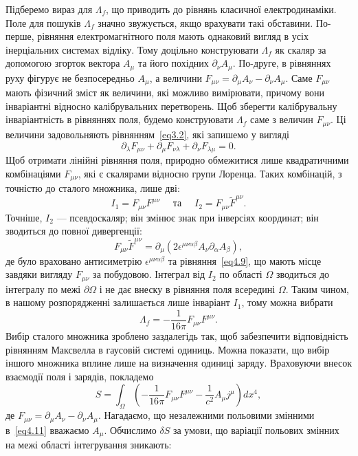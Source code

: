 Підберемо вираз для $\Lambda_f$, що приводить до рівнянь класичної електродинаміки. Поле для пошуків $\Lambda_f$ значно звужується, якщо врахувати такі обставини. По-перше, рівняння електромагнітного поля мають однаковий вигляд в усіх інерціальних системах відліку. Тому доцільно конструювати $\Lambda_f$ як скаляр за допомогою згорток вектора $A_\mu$ та його похідних $\partial_\nu A_\mu$. По-друге, в рівняннях руху фігурує не безпосередньо $A_\mu$, а величини $F_{\mu\nu} = \partial_\mu A_\nu - \partial_\nu A_\mu$. Саме $F_{\mu\nu}$ мають фізичний зміст як величини, які можливо вимірювати, причому вони інваріантні відносно калібрувальних перетворень. Щоб зберегти калібрувальну інваріантність в рівняннях поля, будемо конструювати $\Lambda_f$ саме з величин $F_{\mu\nu}$. Ці величини задовольняють рівнянням~\eqref{eq3.2}, які запишемо у вигляді
\begin{equation}\label{eq4.9}
\partial_\lambda F_{\mu\nu} + \partial_\mu F_{\nu\lambda} + \partial_\nu F_{\lambda\mu} = 0.
\end{equation}
Щоб отримати лінійні рівняння поля, природно обмежитися лише квадратичними комбінаціями $F_{\mu\nu}$, які є скалярами відносно групи Лоренца. Таких комбінацій, з точністю до сталого множника, лише дві:
\begin{equation*}
I_1 = F_{\mu\nu} F^{\mu\nu} \quad \text{ та } \quad I_2 = F_{\mu\nu} \tilde{F}^{\mu\nu}.
\end{equation*}
Точніше, $I_2$ --- псевдоскаляр; він змінює знак при інверсіях координат; він зводиться до повної дивергенції:
\begin{equation*}
F_{\mu\nu} \tilde{F}^{\mu\nu} = \partial_\mu (2\epsilon^{\mu\nu\alpha\beta} A_\nu \partial_\alpha A_\beta),
\end{equation*}
де було враховано антисиметрію $\epsilon^{\mu\nu\alpha\beta}$ та рівняння~\eqref{eq4.9}, що мають місце завдяки вигляду $F_{\mu\nu}$ за побудовою. Інтеграл від $I_2$ по області $\Omega$ зводиться до інтегралу по межі $\partial\Omega$ і не дає внеску в рівняння поля всередині $\Omega$. Таким чином, в нашому розпорядженні залишається лише інваріант $I_1$, тому можна вибрати
\begin{equation}\label{eq4.10}
\Lambda_f = -\frac{1}{16\pi} F_{\mu\nu} F^{\mu\nu}.
\end{equation}
Вибір сталого множника зроблено заздалегідь так, щоб забезпечити відповідність рівнянням Максвелла в гаусовій системі одиниць. Можна показати, що вибір іншого множника вплине лише на визначення одиниці заряду. Враховуючи внесок взаємодії поля і зарядів, покладемо
\begin{equation}\label{eq4.11}
S = \int_{\Omega} \left( -\frac{1}{16\pi} F_{\mu\nu} F^{\mu\nu} - \frac{1}{c^2} A_\mu j^\mu \right) dx^4,
\end{equation}
де $F_{\mu\nu} = \partial_\mu A_\nu - \partial_\nu A_\mu$. Нагадаємо, що незалежними польовими змінними в~\eqref{eq4.11} вважаємо $A_\mu$. Обчислимо $\delta S$ за умови, що варіації польових змінних на межі області інтегрування зникають:

